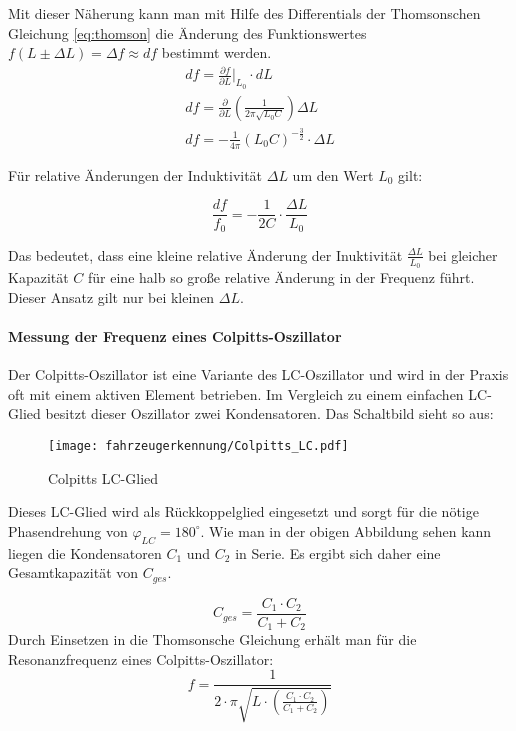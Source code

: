 Mit dieser Näherung kann man mit Hilfe des Differentials der Thomsonschen Gleichung \ref{eq:thomson} die Änderung des Funktionswertes $f(L \pm \Delta L) = \Delta f \approx df$ bestimmt werden.
\begin{align*} \label{eq:df_L}
    df = \frac{\partial f}{\partial L}\bigg|_{L_{0}} \cdot dL \\ 
    df = \frac{\partial}{\partial L}  \left (  \frac{1}{2 \pi \sqrt{L_{0}C}} \right ) \Delta L \\
    df = - \frac{1}{4 \pi} (L_{0}C)^{-\frac{3}{2}} \cdot \Delta L
\end{align*}

Für relative Änderungen der Induktivität $\Delta L$ um den Wert $L_{0}$ gilt:

\begin{equation} \label{eq:f_df}
    \frac{df}{f_{0}} =  -\frac{1}{2C} \cdot \frac{\Delta L}{L_{0}}
\end{equation}

Das bedeutet, dass eine kleine relative Änderung der Inuktivität $\frac{\Delta L}{L_{0}}$ bei gleicher Kapazität $C$ für eine halb so große relative Änderung in der Frequenz führt. 
Dieser Ansatz gilt nur bei kleinen $\Delta L$.

\paragraph{Messung der Frequenz eines Colpitts-Oszillator}\label{sec:colpitts}\mbox{}

Der Colpitts-Oszillator ist eine Variante des LC-Oszillator und wird in der Praxis oft mit einem aktiven Element betrieben. Im Vergleich zu einem einfachen LC-Glied besitzt dieser Oszillator
zwei Kondensatoren. Das Schaltbild sieht so aus:

\begin{figure}[H]
    \centering
    \texttt{[image: fahrzeugerkennung/Colpitts\_LC.pdf]}
    \caption{Colpitts LC-Glied}
\end{figure}

Dieses LC-Glied wird als Rückkoppelglied eingesetzt und sorgt für die nötige Phasendrehung von $\varphi_{LC} = 180^{\circ}$. Wie man in der obigen Abbildung sehen kann liegen die Kondensatoren 
$C_{1}$ und $C_{2}$ in Serie. Es ergibt sich daher eine Gesamtkapazität von $C_{ges}$.

\begin{equation} \label{eq:c_gescolpitts}
    C_{ges} = \frac{C_{1} \cdot C_{2}}{C_{1} + C_{2}}
\end{equation}
Durch Einsetzen in die Thomsonsche Gleichung erhält man für die Resonanzfrequenz eines Colpitts-Oszillator:
\begin{equation} \label{eq:colpitts}
    f = \frac{1}{2 \cdot \pi \sqrt{L \cdot \left( \frac{C_{1} \cdot C_{2}}{C_{1} + C_{2}} \right) }}
\end{equation}

